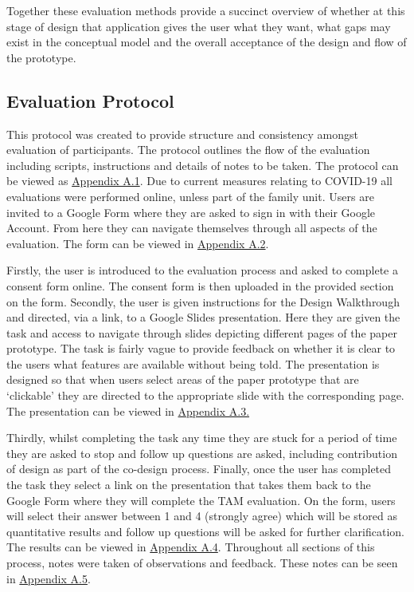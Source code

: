 \documentclass[a4 paper, 12pt]{article}
\begin{document}
Together these evaluation methods provide a succinct overview of whether at this stage of design that application gives the user what they want, what gaps may exist in the conceptual model and the overall acceptance of the design and flow of the prototype.


\subsection{Evaluation Protocol}
This protocol was created to provide structure and consistency amongst evaluation of participants. The protocol outlines the flow of the evaluation including scripts, instructions and details of notes to be taken. The protocol can be viewed as \hyperref[sec:A.1]{Appendix A.1}. Due to current measures relating to COVID-19 all evaluations were performed online, unless part of the family unit. Users are invited to a Google Form where they are asked to sign in with their Google Account. From here they can navigate themselves through all aspects of the evaluation. The form can be viewed in \hyperref[sec:A.2]{Appendix A.2}.  

Firstly, the user is introduced to the evaluation process and asked to complete a consent form online. The consent form is then uploaded in the provided section on the form. Secondly, the user is given instructions for the Design Walkthrough and directed, via a link, to a Google Slides presentation. Here they are given the task and access to navigate through slides depicting different pages of the paper prototype. The task is fairly vague to provide feedback on whether it is clear to the users what features are available without being told. The presentation is designed so that when users select areas of the paper prototype that are ‘clickable’ they are directed to the appropriate slide with the corresponding page. The presentation can be viewed in \hyperref[sec:A.3]{Appendix A.3.}

Thirdly, whilst completing the task any time they are stuck for a period of time they are asked to stop and follow up questions are asked, including contribution of design as part of the co-design process. Finally, once the user has completed the task they select a link on the presentation that takes them back to the Google Form where they will complete the TAM evaluation. On the form, users will select their answer between 1 and 4 (strongly agree) which will be stored as quantitative results and follow up questions will be asked for further clarification. The results can be viewed in \hyperref[sec:A.4]{Appendix A.4}. Throughout all sections of this process, notes were taken of observations and feedback. These notes can be seen in \hyperref[sec:A.5]{Appendix A.5}.
\end{document}
